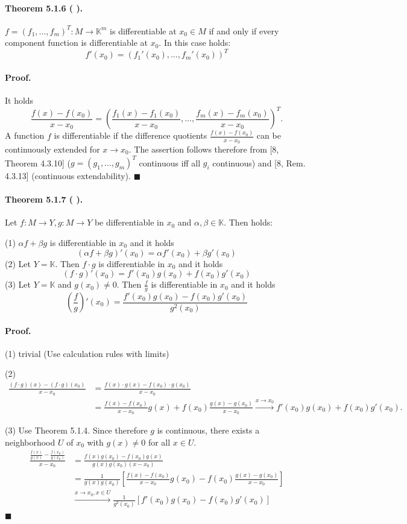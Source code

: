 \documentclass[12pt]{article}
\newcommand{\K}{\mathbb{K}} %
\newcommand{\NumberedTheorem}[3]{%
\paragraph*{Theorem #1 ( #2 ).} #3\par}
\begin{document}
\NumberedTheorem{5.1.6}{}{$f = (f_1, \dots, f_m)^T : M \to \K^m$ is differentiable at $x_0 \in M$ if and only if every component function is differentiable at $x_0$. In this case holds:
\[
f'(x_0) = (f_1'(x_0), \dots, f_m'(x_0))^T
\]
}

\paragraph*{Proof.} It holds
\[
\frac{f(x) - f(x_0)}{x - x_0} = \left( \frac{f_1(x) - f_1(x_0)}{x - x_0}, \dots, \frac{f_m(x) - f_m(x_0)}{x - x_0} \right)^T.
\]
A function $f$ is differentiable if the difference quotients $\frac{f(x)-f(x_0)}{x-x_0}$ can be continuously extended for $x \to x_0$. The assertion follows therefore from [8, Theorem 4.3.10] ($g = (g_1, \dots, g_m)^T$ continuous iff all $g_i$ continuous) and [8, Rem. 4.3.13] (continuous extendability). \hfill $\blacksquare$

\NumberedTheorem{5.1.7}{}{Let $f : M \to Y, g : M \to Y$ be differentiable in $x_0$ and $\alpha, \beta \in \K$. Then holds:
\par\medskip
(1) $\alpha f + \beta g$ is differentiable in $x_0$ and it holds
\[
(\alpha f + \beta g)'(x_0) = \alpha f'(x_0) + \beta g'(x_0)
\]
(2) Let $Y = \K$. Then $f \cdot g$ is differentiable in $x_0$ and it holds
\[
(f \cdot g)'(x_0) = f'(x_0)g(x_0) + f(x_0)g'(x_0)
\]
(3) Let $Y = \K$ and $g(x_0) \neq 0$. Then $\frac{f}{g}$ is differentiable in $x_0$ and it holds
\[
\left(\frac{f}{g}\right)'(x_0) = \frac{f'(x_0)g(x_0) - f(x_0)g'(x_0)}{g^2(x_0)}
\]
}

\paragraph*{Proof.}
(1) trivial (Use calculation rules with limits)

(2)
\begin{align*}
\frac{(f \cdot g)(x) - (f \cdot g)(x_0)}{x - x_0} &= \frac{f(x) \cdot g(x) - f(x_0) \cdot g(x_0)}{x - x_0} \\
&= \frac{f(x) - f(x_0)}{x - x_0}g(x) + f(x_0)\frac{g(x) - g(x_0)}{x - x_0} \xrightarrow{x \to x_0} f'(x_0)g(x_0) + f(x_0)g'(x_0).
\end{align*}

(3) Use Theorem 5.1.4. Since therefore $g$ is continuous, there exists a neighborhood $U$ of $x_0$ with $g(x) \neq 0$ for all $x \in U$.
\begin{align*}
\frac{\frac{f(x)}{g(x)} - \frac{f(x_0)}{g(x_0)}}{x - x_0} &= \frac{f(x)g(x_0) - f(x_0)g(x)}{g(x)g(x_0)(x - x_0)} \\
&= \frac{1}{g(x)g(x_0)} \left[ \frac{f(x) - f(x_0)}{x - x_0}g(x_0) - f(x_0)\frac{g(x) - g(x_0)}{x - x_0} \right] \\
&\xrightarrow{x \to x_0, x \in U} \frac{1}{g^2(x_0)} [f'(x_0)g(x_0) - f(x_0)g'(x_0)]
\end{align*}
\hfill $\blacksquare$
\end{document}
